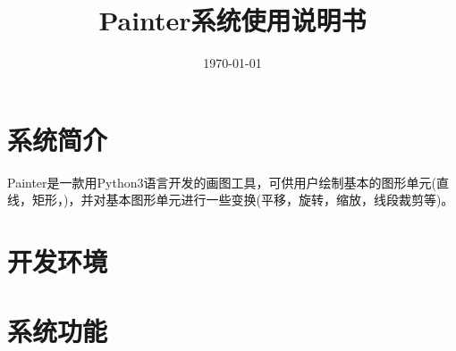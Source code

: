 \documentclass[11pt, a4paper, UTF8]{ctexart}
\title{Painter系统使用说明书}
\date{\today}     %
\begin{document}
\maketitle

\tableofcontents
\newpage

\section{系统简介}

Painter是一款用Python3语言开发的画图工具，可供用户绘制基本的图形单元(直线，矩形，)，并对基本图形单元进行一些变换(平移，旋转，缩放，线段裁剪等)。


\section{开发环境}


\section{系统功能}





















\end{document}
